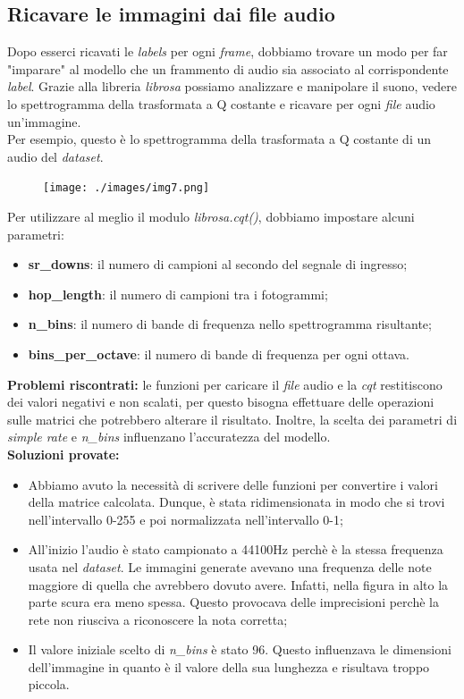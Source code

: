 \subsection{Ricavare le immagini dai file audio}
Dopo esserci ricavati le \textit{labels} per ogni \textit{frame}, dobbiamo trovare un modo per far "imparare" al modello che un frammento di audio sia associato al corrispondente \textit{label}.
Grazie alla libreria \textit{librosa} possiamo analizzare e manipolare il suono, vedere lo spettrogramma della trasformata a Q costante e ricavare per ogni \textit{file} audio un'immagine.\\
Per esempio, questo è lo spettrogramma della trasformata a Q costante di un audio del \textit{dataset}.
\begin{figure}[H]
	\centering
	\texttt{[image: ./images/img7.png]}
\end{figure}
\noindent Per utilizzare al meglio il modulo \textit{librosa.cqt()}, dobbiamo impostare alcuni parametri:
\begin{itemize}
	\item \textbf{sr\_downs}: il numero di campioni al secondo del segnale di ingresso;
	\item \textbf{hop\_length}: il numero di campioni tra i fotogrammi;
	\item \textbf{n\_bins}: il numero di bande di frequenza nello spettrogramma risultante;
	\item \textbf{bins\_per\_octave}: il numero di bande di frequenza per ogni ottava.
\end{itemize}
\textbf{Problemi riscontrati:} le funzioni per caricare il \textit{file} audio e la \textit{cqt} restitiscono dei valori negativi e non scalati, per questo bisogna effettuare delle operazioni sulle matrici che potrebbero alterare il risultato. Inoltre, la scelta dei parametri di \textit{simple rate} e \textit{n\_bins} influenzano l'accuratezza del modello. \\
\newline
\textbf{Soluzioni provate:}
\begin{itemize}
	\item Abbiamo avuto la necessità di scrivere delle funzioni per convertire i valori della matrice calcolata. Dunque, è stata ridimensionata in modo che si trovi nell'intervallo 0-255 e poi normalizzata nell'intervallo 0-1;
	\item All'inizio l'audio è stato campionato a 44100Hz perchè è la stessa frequenza usata nel \textit{dataset}. Le immagini generate avevano una frequenza delle note maggiore di quella che avrebbero dovuto avere. Infatti, nella figura in alto la parte scura era meno spessa. Questo provocava delle imprecisioni perchè la rete non riusciva a riconoscere la nota corretta;
	\item Il valore iniziale scelto di \textit{n\_bins} è stato 96. Questo influenzava le dimensioni dell'immagine in quanto è il valore della sua lunghezza e risultava troppo piccola.
\end{itemize}
